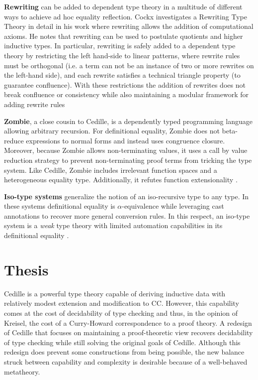 \textbf{Rewriting} can be added to dependent type theory in a multitude of different ways to achieve ad hoc equality reflection.
Cockx investigates a Rewriting Type Theory in detail in his work where rewriting allows the addition of computational axioms.
He notes that rewriting can be used to postulate quotients and higher inductive types.
In particular, rewriting is safely added to a dependent type theory by restricting the left hand-side to linear patterns, where rewrite rules must be orthogonal (i.e. a term can not be an instance of two or more rewrites on the left-hand side), and each rewrite satisfies a technical triangle property (to guarantee confluence).
With these restrictions the addition of rewrites does not break confluence or consistency while also maintaining a modular framework for adding rewrite rules \cite{cockx2020, cockx2021}

\textbf{Zombie}, a close cousin to Cedille, is a dependently typed programming language allowing arbitrary recursion.
For definitional equality, Zombie does not beta-reduce expressions to normal forms and instead uses congruence closure.
Moreover, because Zombie allows non-terminating values, it uses a call by value reduction strategy to prevent non-terminating proof terms from tricking the type system.
Like Cedille, Zombie includes irrelevant function spaces and a heterogeneous equality type.
Additionally, it refutes function extensionality \cite{sjoberg2017}.

\textbf{Iso-type systems} generalize the notion of an iso-recursive type to any type.
In these systems definitional equality is $\alpha$-equivalence while leveraging cast annotations to recover more general conversion rules.
In this respect, an iso-type system is a \textit{weak} type theory with limited automation capabilities in its definitional equality \cite{yang2019}.

\section{Thesis}

Cedille is a powerful type theory capable of deriving inductive data with relatively modest extension and modification to CC.
However, this capability comes at the cost of decidability of type checking and thus, in the opinion of Kreisel, the cost of a Curry-Howard correspondence to a proof theory.
A redesign of Cedille that focuses on maintaining a proof-theoretic view recovers decidability of type checking while still solving the original goals of Cedille.
Although this redesign does prevent some constructions from being possible, the new balance struck between capability and complexity is desirable because of a well-behaved metatheory.

